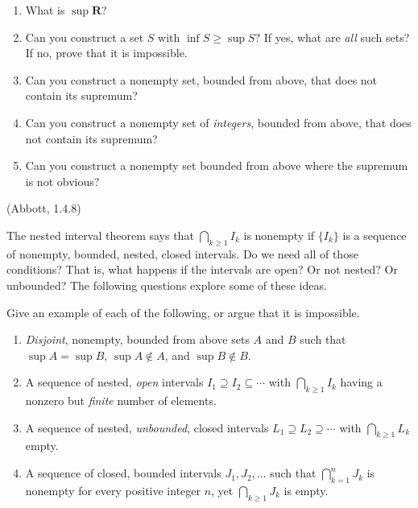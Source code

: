 \documentclass[12pt]{article}
\theoremstyle{definition}
\let\set\mathbf
\begin{document}
\begin{Exercise}
    \begin{enumerate}[label=(\alph*)]
        \item What is $\sup \set{R}$?

        \item Can you construct a set $S$ with $\inf S \geq \sup S$? If yes,
            what are \emph{all} such sets? If no, prove that it is impossible.

        \item Can you construct a nonempty set, bounded from above, that does
            not contain its supremum?

        \item Can you construct a nonempty set of \emph{integers}, bounded from
            above, that does not contain its supremum?

        \item Can you construct a nonempty set bounded from above where the
            supremum is not obvious?
    \end{enumerate}
\end{Exercise}

\begin{Exercise}
    (Abbott, 1.4.8)

    The nested interval theorem says that $\bigcap_{k \geq 1} I_k$ is nonempty
    if $\{I_k\}$ is a sequence of nonempty, bounded, nested, closed intervals.
    Do we need all of those conditions? That is, what happens if the intervals
    are open? Or not nested? Or unbounded? The following questions explore some
    of these ideas.

    Give an example of each of the following, or argue that it is impossible.

    \begin{enumerate}[label=(\alph*)]
        \item \emph{Disjoint}, nonempty, bounded from above sets $A$ and $B$
            such that $\sup A = \sup B$, $\sup A \notin A$, and $\sup B \notin
            B$.

        \item A sequence of nested, \emph{open} intervals $I_1 \supseteq I_2
            \subseteq \cdots$ with $\bigcap_{k \geq 1} I_k$ having a nonzero
            but \emph{finite} number of elements.

        \item A sequence of nested, \emph{unbounded}, closed intervals $L_1
            \supseteq L_2 \supseteq \cdots$ with $\bigcap_{k \geq 1} L_k$
            empty.

        \item A sequence of closed, bounded intervals $J_1, J_2, \dots$ such
            that $\bigcap_{k = 1}^n J_k$ is nonempty for every positive integer
            $n$, yet $\bigcap_{k \geq 1} J_k$ is empty.
    \end{enumerate}
\end{Exercise}
\end{document}

